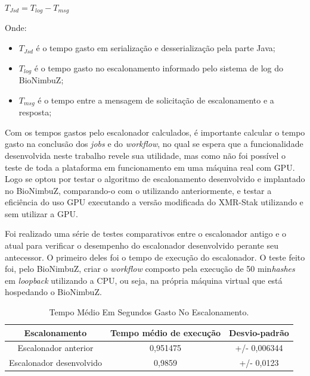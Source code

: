 \centerline{ $T_{Jsd} = T_{log} - T_{msg}$ }

Onde: 
\begin{itemize}
	\item $T_{Jsd}$ é o tempo gasto em serialização e desserialização pela parte Java;
	\item $T_{log}$ é o tempo gasto no escalonamento informado pelo sistema de log do BioNimbuZ;
	\item $T_{msg}$ é o tempo entre a mensagem de solicitação de escalonamento e a resposta;
\end{itemize}

Com os tempos gastos pelo escalonador calculados, é importante calcular o tempo gasto na conclusão dos \textit{jobs} e do \textit{workflow}, no qual se espera que a funcionalidade desenvolvida neste trabalho revele sua utilidade, mas como não foi possível o teste de toda a plataforma em funcionamento em uma máquina real com \acrshort{GPU}. Logo se optou por testar o algoritmo de escalonamento desenvolvido e implantado no BioNimbuZ, comparando-o com o utilizando anteriormente, e testar a eficiência do uso GPU executando a versão modificada do XMR-Stak utilizando e sem utilizar a \acrshort{GPU}.


Foi realizado uma série de testes comparativos entre o escalonador antigo e o atual para verificar o desempenho do escalonador desenvolvido perante seu antecessor. O primeiro deles foi o tempo de execução do escalonador. O teste feito foi, pelo BioNimbuZ, criar o \textit{workflow} composto pela execução de 50 min\textit{hashes} em \textit{loopback} utilizando a \acrshort{CPU}, ou seja, na própria máquina virtual que está hospedando o BioNimbuZ.

\begin {table}[H]
\begin{center}
	\begin{tabular}{ |c|c|c| } 
		\hline
		Escalonamento & Tempo médio de execução & Desvio-padrão \\ 
		\hline
		Escalonador anterior & 0,951475 & +/- 0,006344 \\ 
		\hline
		Escalonador desenvolvido & 0,9859 & +/- 0,0123 \\ 
		\hline
	\end{tabular}
\caption {Tempo Médio Em Segundos Gasto No Escalonamento.} \label{TabelaTempoEscalonador} 
\end{center}
\end {table}

